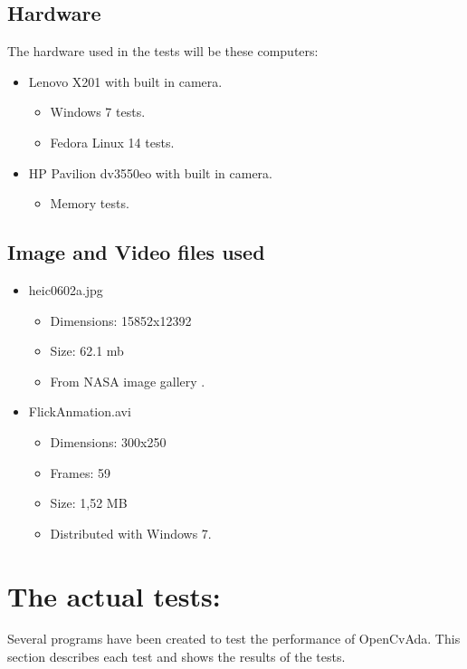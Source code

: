 \subsection{Hardware}
The hardware used in the tests will be these computers:
\begin{itemize}
\item Lenovo X201 with built in camera.
\begin{itemize}
\item Windows 7 tests.
\item Fedora Linux 14 tests.
\end{itemize}
\item HP Pavilion dv3550eo with built in camera.
\begin{itemize}
\item Memory tests.
\end{itemize}
\end{itemize}
\subsection{Image and Video files used}
\begin{itemize}
\item heic0602a.jpg
\begin{itemize}
\item Dimensions: 15852x12392
\item Size: 62.1 mb
\item From NASA image gallery \cite{nasa}.
\end{itemize}
\item FlickAnmation.avi
\begin{itemize}
\item Dimensions: 300x250
\item Frames: 59
\item Size: 1,52 MB
\item Distributed with Windows 7.
\end{itemize}
\end{itemize}
\section{The actual tests:}
Several programs have been created to test the performance of OpenCvAda. This section describes each test and shows the results of the tests.
